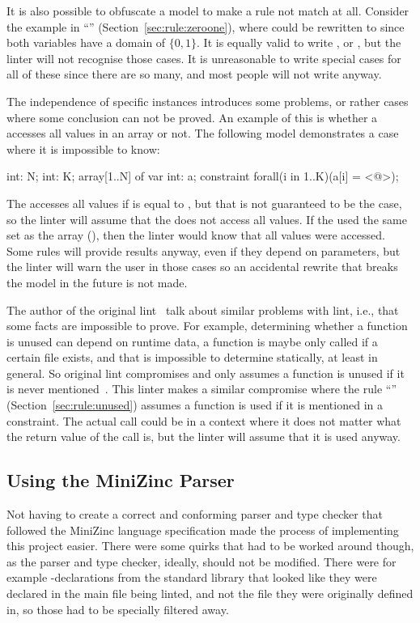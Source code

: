 \documentclass[a4paper,12pt]{article}
\newcommand{\ruleref}[1]{``\nameref{sec:rule:#1}'' (Section~\ref{sec:rule:#1})}
\begin{document}
It is also possible to obfuscate a model to make a rule not match at all. Consider
the example in \ruleref{zeroone}, where
 could be rewritten to  since both variables have a domain of
$\{0,1\}$. It is equally valid to write , or ,
but the linter will not recognise those cases. It is unreasonable to write special cases for
all of these since there are so many, and most people will not write  anyway.

The independence of specific instances introduces some problems, or rather cases where
some conclusion can not be proved.
An example of this is whether a 
accesses all values in an array or not. The following model demonstrates a case
where it is impossible to know:

\begin{mznnobreak}
int: N; int: K;
array[1..N] of var int: a;
constraint forall(i in 1..K)(a[i] = <@\dots@>);
\end{mznnobreak}

The  accesses all values if  is equal to , but that is not
guaranteed to be the case, so the linter will assume that the  does not access
all values. If the  used the same set as the array (), then the
linter would know that all values were accessed. Some rules will provide results anyway,
even if they depend on parameters, but the linter will warn the user in those cases so an
accidental rewrite that breaks the model in the future is not made.

The author of the original lint~\cite{lint} talk about similar problems with lint, i.e.,
that some facts are impossible to prove. For example, determining whether a function is
unused can depend on runtime data, a function is maybe only called if a certain file
exists, and that is impossible to determine statically, at least in general. So original
lint compromises and only assumes a function is unused if it is never
mentioned~\cite{lint}. This linter makes a similar compromise where the rule
\ruleref{unused} assumes a function is used if it is mentioned in a constraint. The actual
call could be in a context where it does not matter what the return value of the call is,
but the linter will assume that it is used anyway.

\subsection{Using the MiniZinc Parser}
Not having to create a correct and conforming parser and type checker that followed the
MiniZinc language specification made the process of implementing this project easier.
There were some quirks that had to be worked around though, as the parser and type
checker, ideally, should not be modified. There were for example -declarations
from the standard library that looked like they were declared in the main file being
linted, and not the file they were originally defined in, so those had to be specially
filtered away.
\end{document}
